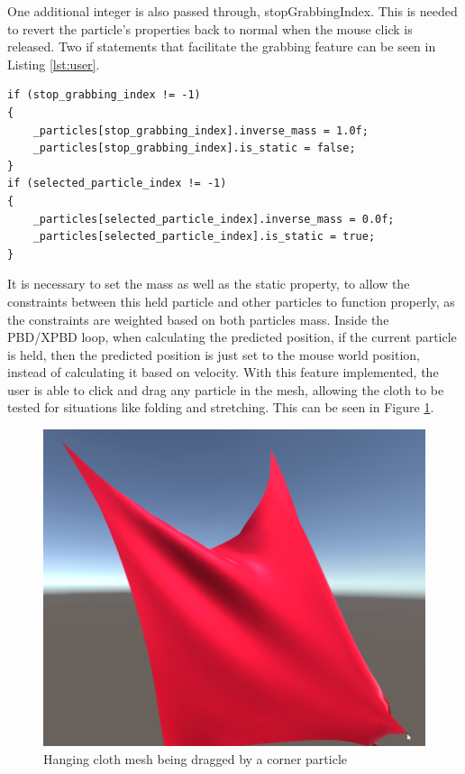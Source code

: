 \documentclass[12pt,a4paper]{article}
\begin{document}
One additional integer is also passed through, stopGrabbingIndex. This is needed to revert the particle's properties back to normal when the mouse click is released. Two if statements that facilitate the grabbing feature can be seen in Listing \ref{lst:user}.
\begin{lstlisting}[caption={Modifying particles from user interaction},label={lst:user}]
if (stop_grabbing_index != -1)
{
	_particles[stop_grabbing_index].inverse_mass = 1.0f;
	_particles[stop_grabbing_index].is_static = false;
}
if (selected_particle_index != -1)
{
	_particles[selected_particle_index].inverse_mass = 0.0f;
	_particles[selected_particle_index].is_static = true;
}	
\end{lstlisting}
It is necessary to set the mass as well as the static property, to allow the constraints between this held particle and other particles to function properly, as the constraints are weighted based on both particles mass. Inside the PBD/XPBD loop, when calculating the predicted position, if the current particle is held, then the predicted position is just set to the mouse world position, instead of calculating it based on velocity. With this feature implemented, the user is able to click and drag any particle in the mesh, allowing the cloth to be tested for situations like folding and stretching. This can be seen in Figure \ref{fig:drag}.
\begin{figure}
	\centering
	\includegraphics[scale=0.5]{drag.png}
	\caption{Hanging cloth mesh being dragged by a corner particle}
	\label{fig:drag}
\end{figure}
\end{document}
